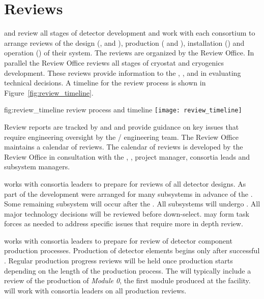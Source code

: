 \chapter{Reviews}
\label{vl:tc-review}

 and  review all stages of detector development
and work with each consortium to arrange reviews of the design
(,  and ), production (
and ), installation () and operation
() of their system. The reviews are organized by the
 Review Office. In parallel the Review Office reviews all
stages of  cryostat and cryogenics development.  These
reviews provide information to the , , and 
in evaluating technical decisions. A timeline for the review process
is shown in Figure~\ref{fig:review_timeline}.
\begin{dunefigure}{fig:review_timeline}
  { review process and timeline}
  \texttt{[image: review\_timeline]}
\end{dunefigure}
Review reports are tracked by  and  and provide
guidance on key issues that require engineering oversight by the
/ engineering team. The Review Office maintains a
calendar of  reviews. The calendar of reviews is developed
by the Review Office in consultation with the ,
,  project manager, consortia leads and
 subsystem managers.

 works with consortia leaders to prepare for reviews of all detector
designs.  As part of the  development  were
arranged for many subsystems in advance of the . Some
remaining subsystem  will occur after the . All
subsystems will undergo .  All major technology decisions
will be reviewed before down-select.   may form task forces
as needed to address specific issues that require more in depth
review.


 works with consortia leaders to prepare for review of detector component production processes.
Production of detector elements begins only after successful
. Regular production progress reviews will be held once
production starts depending on the length of the production
process. The  will typically include a review of the
production of \textit{Module 0}, the first module produced at the
facility.  will work with consortia leaders on all
production reviews.


